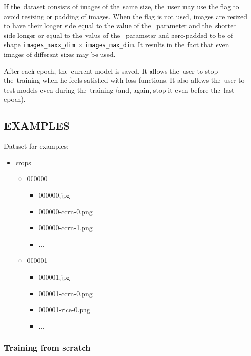 If the~dataset consists of images of the~same size, the~user may use the
 flag to avoid resizing or padding of images. When the
flag is not used, images are resized to have their longer side equal to the
value of the~ parameter and the~shorter
side longer or equal to the~value of the~
parameter and zero-padded to be of shape \verb|images_maxx_dim| $\times$
\verb|images_max_dim|. It results in the~fact that even images of different
sizes may be used. 

After each epoch, the~current model is saved. It allows the~user to stop
the~training when he feels satisfied with loss functions. It also allows
the~user to test models even during the~training (and, again, stop it even
before the~last epoch). 

\subsection*{EXAMPLES}
Dataset for examples: 

\liststyleLii
\begin{itemize}
\item crops 

\begin{itemize}
\item 000000 

\begin{itemize}
\item 000000.jpg 
\item 000000-corn-0.png 
\item 000000-corn-1.png 
\item ... 
\end{itemize}
\item 000001 

\begin{itemize}
\item 000001.jpg 
\item 000001-corn-0.png 
\item 000001-rice-0.png 
\item ... 
\end{itemize}
\end{itemize}
\end{itemize}

\subsubsection*{Training from scratch}

